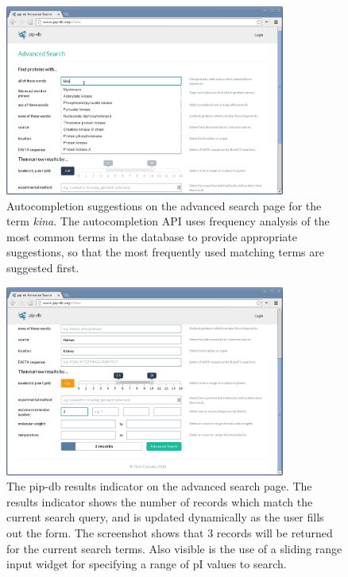 \begin{figure}[H]
\centering
    \includegraphics[width=0.82\textwidth]{assets/pip-db-autocomplete}
\caption[Autocompletion suggestions in pip-db]
        {Autocompletion suggestions on the advanced search page for
          the term \textit{kina}. The autocompletion API uses
          frequency analysis of the most common terms in the database
          to provide appropriate suggestions, so that the most
          frequently used matching terms are suggested first.}
\label{fig:pip-db-autocomplete}
\end{figure}


\begin{figure}[H]
\centering
    \includegraphics[width=0.82\textwidth]{assets/pip-db-results-indicator}
\caption[pip-db results indicator]
        {The pip-db results indicator on the advanced search page. The
          results indicator shows the number of records which match
          the current search query, and is updated dynamically as the
          user fills out the form. The screenshot shows that 3 records
          will be returned for the current search terms. Also visible
          is the use of a sliding range input widget for specifying a
          range of pI values to search.}
\label{fig:pip-db-results-indicator}
\end{figure}


